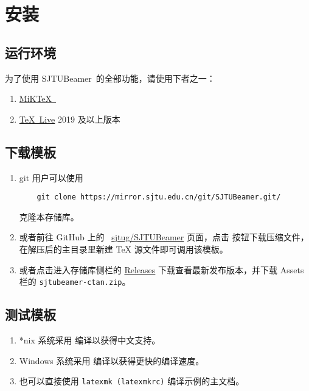 \documentclass[
    UTF8,
    heading=true,
    12pt,
    a4paper
]{ctexrep}
\def\themename{\textsf{SJTUBeamer}}
\begin{document}
\chapter{安装}

\section{运行环境}

为了使用 \themename\ 的全部功能，请使用下者之一：
\begin{enumerate}
  \item \href{https://miktex.org/}{MiK\TeX\ }
  \item \href{https://mirrors.sjtug.sjtu.edu.cn/ctan/systems/texlive/Images/texlive2021-20210325.iso}{\TeX\ Live} 2019 及以上版本
\end{enumerate}

\section{下载模板}

\begin{enumerate}
  \item git 用户可以使用
        \begin{verbatim}
    git clone https://mirror.sjtu.edu.cn/git/SJTUBeamer.git/  
  \end{verbatim}
        克隆本存储库。
  \item 或者前往 GitHub 上的 \faGithub{}~\href{https://github.com/sjtug/SJTUBeamer}{sjtug/SJTUBeamer} 页面，点击  按钮下载压缩文件，在解压后的主目录里新建 \TeX{} 源文件即可调用该模板。
  \item 或者点击进入存储库侧栏的 \href{https://github.com/sjtug/SJTUBeamer/releases}{\textsf{Releases}} 下载查看最新发布版本，并下载 \textsf{Assets} 栏的 \texttt{sjtubeamer-ctan.zip}。
\end{enumerate}

\section{测试模板}

\begin{enumerate}
  \item[ \faApple\ \faLinux] *nix 系统采用  编译以获得中文支持。
  \item[ \faWindows] Windows 系统采用  编译以获得更快的编译速度。
  \item[\faWrench] 也可以直接使用 \texttt{latexmk (latexmkrc)} 编译示例的主文档。
\end{enumerate}
\end{document}
